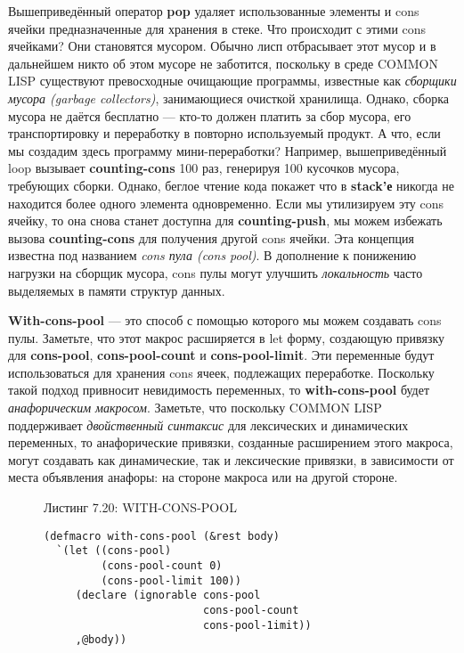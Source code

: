 Вышеприведённый оператор \textbf{pop} удаляет использованные элементы и cons ячейки предназначенные для хранения в стеке. Что происходит с этими cons ячейками? Они становятся мусором. Обычно лисп отбрасывает этот мусор и в дальнейшем никто об этом мусоре не заботится, поскольку в среде COMMON LISP существуют превосходные очищающие программы, известные как \emph{сборщики мусора (garbage collectors)}, занимающиеся очисткой хранилища. Однако, сборка мусора не даётся бесплатно --- кто-то должен платить за сбор мусора, его транспортировку и переработку в повторно используемый продукт. А что, если мы создадим здесь программу мини-переработки? Например, вышеприведённый loop вызывает \textbf{counting-cons} 100 раз, генерируя 100 кусочков мусора, требующих сборки. Однако, беглое чтение кода покажет что в \textbf{stack'е} никогда не находится более одного элемента одновременно. Если мы утилизируем эту cons ячейку, то она снова станет доступна для \textbf{counting-push}, мы можем избежать вызова \textbf{counting-cons} для получения другой cons ячейки. Эта концепция известна под названием \emph{cons пула (cons pool)}. В дополнение к понижению нагрузки на сборщик мусора, cons пулы могут улучшить \emph{локальность} часто выделяемых в памяти структур данных.

\textbf{With-cons-pool} --- это способ с помощью которого мы можем создавать cons пулы. Заметьте, что этот макрос расширяется в let форму, создающую привязку для \textbf{cons-pool}, \textbf{cons-pool-count} и \textbf{cons-pool-limit}. Эти переменные будут использоваться для хранения cons ячеек, подлежащих переработке. Поскольку такой подход привносит невидимость переменных, то \textbf{with-cons-pool} будет \emph{анафорическим макросом}. Заметьте, что поскольку COMMON LISP поддерживает \emph{двойственный синтаксис} для лексических и динамических переменных, то анафорические привязки, созданные расширением этого макроса, могут создавать как динамические, так и лексические привязки, в зависимости от места объявления анафоры: на стороне макроса или на другой стороне.

\begin{figure}Листинг 7.20: WITH-CONS-POOL\label{listing_7.20}
\listbegin
\begin{verbatim}
(defmacro with-cons-pool (&rest body)
  `(let ((cons-pool)
         (cons-pool-count 0)
         (cons-pool-limit 100))
     (declare (ignorable cons-pool
                         cons-pool-count
                         cons-pool-1imit))
     ,@body))
\end{verbatim}
\listend
\end{figure}

